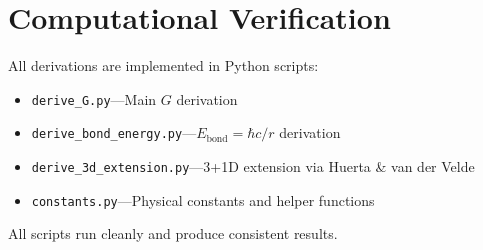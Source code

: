 \documentclass[11pt,letterpaper]{article}
\begin{document}
\section{Computational Verification}

All derivations are implemented in Python scripts:

\begin{itemize}
  \item \texttt{derive\_G.py}---Main $G$ derivation
  \item \texttt{derive\_bond\_energy.py}---$E_{\mathrm{bond}} = \hbar c/r$ derivation
  \item \texttt{derive\_3d\_extension.py}---3+1D extension via Huerta \& van der Velde
  \item \texttt{constants.py}---Physical constants and helper functions
\end{itemize}

All scripts run cleanly and produce consistent results.



\end{document}
